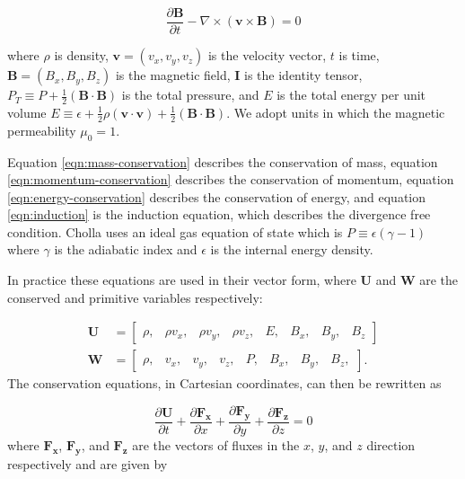 \documentclass[modern, linenumbers]{aastex631}
\begin{document}
\begin{equation}
    \label{eqn:induction}
    \frac{\partial \boldsymbol{B}}{\partial t} - \nabla \times (\boldsymbol{v} \times \boldsymbol{B}) = 0
\end{equation}

\noindent where $\rho$ is density, $\boldsymbol{v} = ( v_x, v_y, v_z)$ is the velocity vector, $t$ is time, $\boldsymbol{B} = ( B_x, B_y, B_z)$ is the magnetic field, $\boldsymbol{I}$ is the identity tensor, $P_T \equiv P + \frac{1}{2}(\boldsymbol{B} \cdot \boldsymbol{B})$ is the total pressure, and $E$ is the total energy per unit volume $E \equiv \epsilon + \frac{1}{2}\rho(\boldsymbol{v}\cdot\boldsymbol{v}) + \frac{1}{2}(\boldsymbol{B}\cdot\boldsymbol{B})$. We adopt units in which the magnetic permeability $\mu_0 = 1$.

Equation \ref{eqn:mass-conservation} describes the conservation of mass, equation \ref{eqn:momentum-conservation} describes the conservation of momentum, equation \ref{eqn:energy-conservation} describes the conservation of energy, and equation \ref{eqn:induction} is the induction equation, which describes the divergence free condition. Cholla uses an ideal gas equation of state  which is $P \equiv \epsilon(\gamma - 1)$ where $\gamma$ is the adiabatic index and $\epsilon$ is the internal energy density.

In practice these equations are used in their vector form, where $\boldsymbol{U}$ and $\boldsymbol{W}$ are the conserved and primitive variables respectively:

\begin{align}
    \boldsymbol{U} &= \begin{bmatrix}
            \rho , &
            \rho v_x, &
            \rho v_y, &
            \rho v_z, &
            E,   &
            B_x, &
            B_y, &
            B_z
         \end{bmatrix}
    \\
    \boldsymbol{W} &= \begin{bmatrix}
            \rho, &
            v_x, &
            v_y, &
            v_z, &
            P,   &
            B_x, &
            B_y, &
            B_z,
         \end{bmatrix}.
\end{align}
The conservation equations, in Cartesian coordinates, can then be rewritten as

\begin{equation}
    \label{eqn:vector-conserved}
    \frac{\partial \boldsymbol{U}}{\partial t} +
    \frac{\partial \boldsymbol{F_x}}{\partial x} +
    \frac{\partial \boldsymbol{F_y}}{\partial y} +
    \frac{\partial \boldsymbol{F_z}}{\partial z} = 0
\end{equation}
where $\boldsymbol{F_x}$, $\boldsymbol{F_y}$, and $\boldsymbol{F_z}$ are the vectors of fluxes in the $x$, $y$, and $z$ direction respectively and are given by
\end{document}
